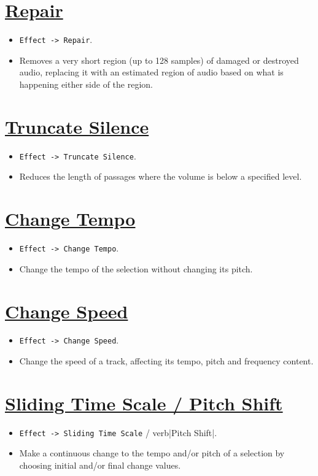 \section{\href{http://manual.audacityteam.org/o/man/repair.html}{Repair}}
\begin{itemize}
\item \verb|Effect -> Repair|.
\item Removes a very short region (up to 128 samples) of damaged or
  destroyed audio, replacing it with an estimated region of audio
  based on what is happening either side of the region.
\end{itemize}

\section{\href{http://manual.audacityteam.org/o/man/truncate_silence.html}{Truncate Silence}}
\begin{itemize}
\item \verb|Effect -> Truncate Silence|.
\item Reduces the length of passages where the volume is below a specified level.
\end{itemize}

\section{\href{http://manual.audacityteam.org/o/man/change_tempo.html}{Change Tempo}}
\begin{itemize}
\item \verb|Effect -> Change Tempo|.
\item Change the tempo of the selection without changing its pitch.
\end{itemize}

\section{\href{http://manual.audacityteam.org/o/man/change_speed.html}{Change Speed}}
\begin{itemize}
\item \verb|Effect -> Change Speed|.
\item Change the speed of a track, affecting its tempo, pitch and
  frequency content.
\end{itemize}

\section{\href{http://manual.audacityteam.org/o/man/sliding_time_scale_pitch_shift.html}{Sliding Time Scale / Pitch Shift}}
\begin{itemize}
\item \verb|Effect -> Sliding Time Scale| / verb|Pitch Shift|.
\item Make a continuous change to the tempo and/or pitch of a
  selection by choosing initial and/or final change values.
\end{itemize}

